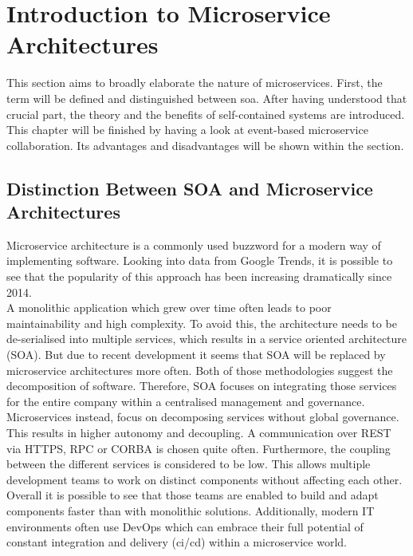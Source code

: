\section{Introduction to Microservice  Architectures}
\label{sec:techKnowHow}
This section aims to broadly elaborate the nature of microservices. First, the term will be defined and distinguished between \acrfull{soa}. After having understood that crucial part, the theory and the benefits of self-contained systems are introduced. This chapter will be finished by having a look at event-based microservice collaboration. Its advantages and disadvantages will be shown within the section. 

\subsection{Distinction Between SOA and Microservice Architectures}
Microservice architecture is a commonly used buzzword for a modern way of implementing software. Looking into data from Google Trends, it is possible to see that the popularity of this approach has been increasing dramatically since 2014. \cite{microservices}\newline
\\
A monolithic application which grew over time often leads to poor maintainability and high complexity. To avoid this, the architecture needs to be de-serialised into multiple services, which results in a service oriented architecture (SOA). But due to recent development it seems that SOA will be replaced by microservice architectures more often.\cite{mircorVSsoa}\newline
Both of those methodologies suggest the decomposition of software. Therefore, SOA focuses on integrating those services for the entire company within a centralised management and governance. Microservices instead, focus on decomposing services without global governance. This results in higher autonomy and decoupling. \cite{mircorVSsoa} A communication over REST via HTTPS, RPC or CORBA is chosen quite often.\newline
Furthermore, the coupling between the different services is considered to be low. This allows multiple development teams to work on distinct components without affecting each other. Overall it is possible to see that those teams are enabled to build and adapt components faster than with monolithic solutions. Additionally,  modern IT environments often use DevOps which can embrace their full potential of constant integration and delivery (\acrshort{ci/cd}) within a microservice  world. \cite{redHatMicroservices}\newline
